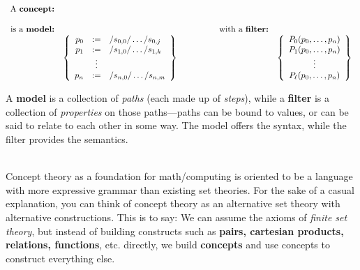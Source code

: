\documentclass[twoside]{article}
\begin{document}
$$ \begin{array}{rlrl}
 \mbox{A \bfseries concept:}										\\
													\\
 \mbox{is a \bfseries model:}	&			&  \qquad\qquad \mbox{with a \bfseries filter:}	\\
 & \left\{\begin{array}{rcl}
   p_0	& :=		& /s_{0,0}/\ldots/s_{0,j}			\\
   p_1	& :=		& /s_{1,0}/\ldots/s_{1,k}			\\
         & \vdots	& 						\\
   p_n	& :=		& /s_{n,0}/\ldots/s_{n,m}			\\
   \end{array}\right\} && \left\{\begin{array}{c}
   P_0(p_0,\ldots,p_n)							\\
   P_1(p_0,\ldots,p_n)							\\
   \vdots								\\
   P_\ell(p_0,\ldots,p_n)						\\
   \end{array}\right\}
\end{array} $$

A {\bfseries model} is a collection of \emph{paths} (each made up of \emph{steps}), while a {\bfseries filter} is a collection
of \emph{properties} on those paths---paths can be bound to values, or can be said to relate to each other in some way.
The model offers the syntax, while the filter provides the semantics.

\ \\[0.5cm]

Concept theory as a foundation for math/computing is oriented to be a language with more expressive grammar than existing set theories.
For the sake of a casual explanation, you can think of concept theory as an alternative set theory with alternative constructions.
This is to say: We can assume the axioms of \emph{finite set theory}, but instead of building constructs such as
{\bfseries pairs, cartesian products, relations, functions}, etc. directly, we build {\bfseries concepts} and use concepts
to construct everything else.
\end{document}
